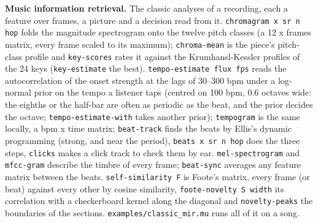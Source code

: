 \documentclass[11pt,a4paper]{article}
\newcommand{\musil}[1]{\lstinline[style=musilinline]{#1}}
\begin{document}
\textbf{Music information retrieval.} The classic analyses of a recording, each a feature
over frames, a picture and a decision read from it. \musil{chromagram x sr n hop} folds
the magnitude spectrogram onto the twelve pitch classes (a 12 x frames matrix, every frame
scaled to its maximum); \musil{chroma-mean} is the piece's pitch-class profile and
\musil{key-scores} rates it against the Krumhansl-Kessler profiles of the 24 keys
(\musil{key-estimate} the best). \musil{tempo-estimate flux fps} reads the autocorrelation
of the onset strength at the lags of 30--300 bpm under a log-normal prior on the tempo a
listener taps (centred on 100 bpm, 0.6 octaves wide: the eighths or the half-bar are often
as periodic as the beat, and the prior decides the octave; \musil{tempo-estimate-with}
takes another prior); \musil{tempogram} is the same locally, a bpm x time matrix;
\musil{beat-track} finds the beats by Ellis's dynamic programming (strong, and near the
period), \musil{beats x sr n hop} does the three steps, \musil{clicks} makes a click
track to check them by ear. \musil{mel-spectrogram} and \musil{mfcc-gram} describe the
timbre of every frame; \musil{beat-sync} averages any feature matrix between the beats.
\musil{self-similarity F} is Foote's matrix, every frame (or beat) against every other by
cosine similarity, \musil{foote-novelty S width} its correlation with a checkerboard kernel
along the diagonal and \musil{novelty-peaks} the boundaries of the sections.
\texttt{examples/classic\_mir.mu} runs all of it on a song.
\end{document}
